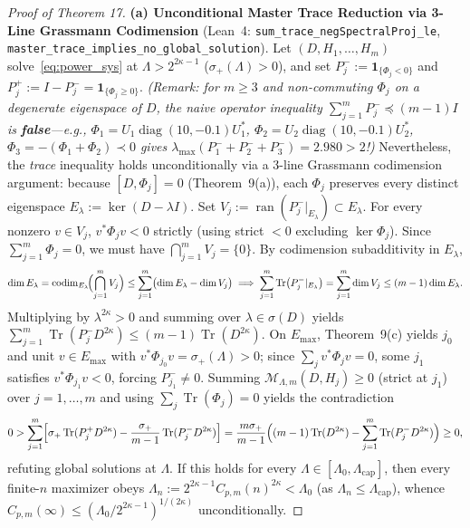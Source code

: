 \documentclass[10pt,letterpaper]{article}
\newcommand{\Tr}{\operatorname{Tr}}
\newcommand{\ran}{\operatorname{ran}}
\newcommand{\diag}{\operatorname{diag}}
\newcommand{\codim}{\operatorname{codim}}
\begin{document}
\begin{proof}[Proof of Theorem 17]
\textbf{(a) Unconditional Master Trace Reduction via 3-Line Grassmann Codimension} (Lean~4: \texttt{sum\_trace\_\allowbreak negSpectralProj\_le}, \texttt{master\_trace\_\allowbreak implies\_no\_global\_solution}).
Let $(D, H_1, \dots, H_m)$ solve~\eqref{eq:power_sys} at $\Lambda > 2^{2\kappa-1}$ ($\sigma_+(\Lambda) > 0$), and set $P_j^- := \mathbf{1}_{\{\Phi_j < 0\}}$ and $P_j^+ := I - P_j^- = \mathbf{1}_{\{\Phi_j \ge 0\}}$. \emph{(Remark: for $m \ge 3$ and non-commuting $\Phi_j$ on a degenerate eigenspace of $D$, the naive operator inequality $\sum_{j=1}^m P_j^- \preceq (m - 1)I$ is \textbf{false}—e.g., $\Phi_1 = U_1\diag(10, -0.1)U_1^*$, $\Phi_2 = U_2\diag(10, -0.1)U_2^*$, $\Phi_3 = -(\Phi_1+\Phi_2) \prec 0$ gives $\lambda_{\max}(P_1^- + P_2^- + P_3^-) = 2.980 > 2$!)} Nevertheless, the \emph{trace} inequality holds unconditionally via a 3-line Grassmann codimension argument: because $[D, \Phi_j] = 0$ (Theorem~9(a)), each $\Phi_j$ preserves every distinct eigenspace $E_\lambda := \ker(D - \lambda I)$. Set $V_j := \ran(P_j^-|_{E_\lambda}) \subset E_\lambda$. For every nonzero $v \in V_j$, $v^* \Phi_j v < 0$ strictly (using strict $< 0$ excluding $\ker \Phi_j$). Since $\sum_{j=1}^m \Phi_j = 0$, we must have $\bigcap_{j=1}^m V_j = \{0\}$. By codimension subadditivity in $E_\lambda$,
\[
  \dim E_\lambda = \codim_{E_\lambda}\!\Bigl(\bigcap_{j=1}^m V_j\Bigr) \le \sum_{j=1}^m \bigl(\dim E_\lambda - \dim V_j\bigr)
  \implies \sum_{j=1}^m \Tr\bigl(P_j^-|_{E_\lambda}\bigr) = \sum_{j=1}^m \dim V_j \le (m - 1)\dim E_\lambda.
\]
Multiplying by $\lambda^{2\kappa} > 0$ and summing over $\lambda \in \sigma(D)$ yields $\sum_{j=1}^m \Tr(P_j^- D^{2\kappa}) \le (m - 1)\Tr(D^{2\kappa})$. On $E_{\max}$, Theorem~9(c) yields $j_0$ and unit $v \in E_{\max}$ with $v^*\Phi_{j_0} v = \sigma_+(\Lambda) > 0$; since $\sum_j v^*\Phi_j v = 0$, some $j_1$ satisfies $v^*\Phi_{j_1} v < 0$, forcing $P_{j_1}^- \neq 0$. Summing $\mathcal{M}_{\Lambda, m}(D, H_j) \ge 0$ (strict at $j_1$) over $j = 1,\dots,m$ and using $\sum_j \Tr(\Phi_j) = 0$ yields the contradiction
\[
  0 > \sum_{j=1}^m \Bigl[\sigma_+\Tr(P_j^+ D^{2\kappa}) - \frac{\sigma_+}{m - 1}\Tr(P_j^- D^{2\kappa})\Bigr]
    = \frac{m\sigma_+}{m - 1}\Bigl((m - 1)\Tr(D^{2\kappa}) - \sum_{j=1}^m \Tr(P_j^- D^{2\kappa})\Bigr) \ge 0,
\]
refuting global solutions at $\Lambda$. If this holds for every $\Lambda \in [\Lambda_0, \Lambda_{\mathrm{cap}}]$, then every finite-$n$ maximizer obeys $\Lambda_n := 2^{2\kappa-1} C_{p,m}(n)^{2\kappa} < \Lambda_0$ (as $\Lambda_n \le \Lambda_{\mathrm{cap}}$), whence $C_{p,m}(\infty) \le (\Lambda_0 / 2^{2\kappa-1})^{1/(2\kappa)}$ unconditionally.


\end{proof}
\end{document}
